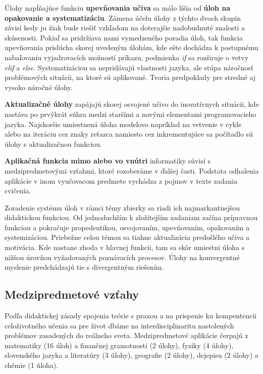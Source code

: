 Úlohy napĺňajúce funkciu \textbf{upevňovania učiva} sa málo líšia od \textbf{úloh na opakovanie a systematizáciu}. Zámena účelu úlohy z týchto dvoch skupín závisí kedy ju žiak bude riešiť vzhľadom na doterajšie nadobudnuté znalosti a skúsenosti. Pokiaľ sa pridržiava nami vymedzeného poradia úloh, tak funkcia upevňovania prislúcha skorej uvedeným úlohám, kde ešte dochádza k postupnému nabaľovaniu vyjadrovacích možností príkazu, podmienka \emph{if} sa rozširuje o vetvy \emph{elif} a \emph{else}. Systematizáciou sa nepridávajú vlastnosti jazyka, ale stúpa náročnosť problémových situácii, na ktoré sú aplikované. Tvoria predpoklady pre stredné aj vysoko náročné úlohy.

\textbf{Aktualizačné úlohy} zapájajú skorej osvojené učivo do inovatívnych situácii, kde nastáva po prvýkrát súhra medzi staršími a novými elementami programovacieho jazyka. Najskoršie umiestnená úloha modelovo napríklad na vetvenie v cykle alebo na iteráciu cez znaky reťazca namiesto cez inkrementujúce sa počítadlo sú úlohy s aktualizačnou funkciou.

\textbf{Aplikačná funkcia mimo alebo vo vnútri} informatiky súvisí s medzipredmetovými vzťahmi, ktoré rozoberáme v ďalšej časti. Podstata odhalenia aplikácie v inom vyučovacom predmete vychádza z pojmov v texte zadania cvičenia.

Zoradenie systému úloh v rámci témy zbierky sa riadi ich najmarkantnejšou didaktickou funkciou. Od jednoduchším k zložitejším zadaniam začína prípravnou funkciou a pokračuje propedeutikou, osvojovaním, upevňovaním, opakovaním a systemizáciou. Priebežne celou témou sa tiahne aktualizácia predošlého učiva a motivácia. Kde nastane zhoda v hlavnej funkcii, tam sa skôr umiestni úloha s nižšou úrovňou vyžadovaných poznávacích procesov. Úlohy na konvergentné myslenie predchádzajú tie s divergentným riešením.

\subsection{Medzipredmetové vzťahy}
Podľa didaktickej zásady spojenia teórie s praxou a na prispenie ku kompentencii celoživotného učenia sa pre život dbáme na interdisciplinaritu nastolených problémov zasadených do reálneho sveta. Medzipredmetové aplikácie čerpajú z matematiky (16 úloh) a finančnej gramotnosti (2 úlohy), fyziky (4 úlohy), slovenského jazyka a literatúry (3 úlohy), geografie (2 úlohy), dejepisu (2 úlohy) a chémie (1 úloha).

